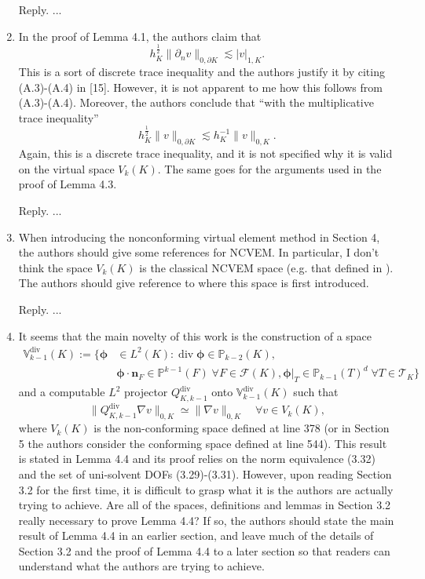 \documentclass[10pt]{amsart}
\theoremstyle{definition}
\theoremstyle{remark}
\renewcommand{\div}{\operatorname{div}}
\begin{document}
\begin{enumerate}[1.]
\smallskip \noindent \textcolor[rgb]{1.00,0.00,0.00}{Reply.}
...

\medskip

\item \textsf{In the proof of Lemma 4.1, the authors claim that
$$
h_K^{\frac{1}{2}}\|\partial_nv\|_{0,\partial K}\lesssim |v|_{1,K}.
$$
This is a sort of discrete trace inequality and the authors justify it by citing (A.3)-(A.4) in [15]. However, it is not apparent to me how this follows from (A.3)-(A.4). Moreover, the authors conclude that “with the multiplicative trace inequality”
$$
h_K^{\frac{1}{2}}\|v\|_{0,\partial K}\lesssim h_K^{-1}\|v\|_{0,K}.
$$
Again, this is a discrete trace inequality, and it is not specified why it is valid on the virtual space $V_k(K)$. The same goes for the arguments used in the proof of Lemma 4.3.}

\smallskip \noindent \textcolor[rgb]{1.00,0.00,0.00}{Reply.}
...

\medskip

\item \textsf{When introducing the nonconforming virtual element method in Section 4, the authors should give some references for NCVEM. In particular, I don’t think the space $V_k(K)$ is the classical NCVEM space (e.g. that defined in \cite{AyusodeDiosLipnikovManzini2016}). The authors should give reference to where this space is first introduced.}

\smallskip \noindent \textcolor[rgb]{1.00,0.00,0.00}{Reply.}
...

\medskip

\item \textsf{It seems that the main novelty of this work is the construction of a space
\begin{align*}
\mathbb V_{k-1}^{\div}(K):=\{\boldsymbol{\phi}&\in L^2(K): \div\boldsymbol{\phi}\in\mathbb P_{k-2}(K), \\
& \boldsymbol{\phi}\cdot\boldsymbol{n}_F\in\mathbb P^{k-1}(F)\;\forall F\in\mathcal F(K), \boldsymbol{\phi}|_T\in\mathbb P_{k-1}(T)^d\;\forall T\in\mathcal T_K
\}
\end{align*}
and a computable $L^2$ projector $Q_{K,k-1}^{\div}$ onto $\mathbb V_{k-1}^{\div}(K)$ such that
$$
\|Q_{K,k-1}^{\div}\nabla v\|_{0,K}\simeq \|\nabla v\|_{0,K} \quad\forall v\in V_k(K),
$$
where $V_k(K)$ is the non-conforming space defined at line 378 (or in Section 5 the authors consider the conforming space defined at line 544). This result is stated in Lemma 4.4 and its proof relies on the norm equivalence (3.32) and the set of uni-solvent DOFs (3.29)-(3.31). However, upon reading Section 3.2 for the first time, it is difficult to grasp what it is the authors are actually trying to achieve. Are all of the spaces, definitions and lemmas in Section 3.2 really necessary to prove Lemma 4.4? If so, the authors should state the main result of Lemma 4.4 in an earlier section, and leave much of the details of Section 3.2 and the proof of Lemma 4.4 to a later section so that readers can understand what the authors are trying to achieve.}


\end{enumerate}
\end{document}
